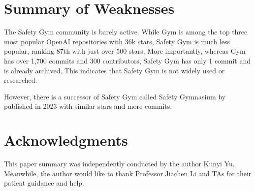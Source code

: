 \documentclass{article}
\begin{document}
\section{Summary of Weaknesses}

The Safety Gym community is barely active. While Gym is among the top three most popular OpenAI repositories with 36k stars, Safety Gym is much less popular, ranking 87th with just over 500 stars. More importantly, whereas Gym has over 1,700 commits and 300 contributors, Safety Gym has only 1 commit and is already archived. This indicates that Safety Gym is not widely used or researched.

However, there is a successor of Safety Gym called Safety Gymnasium by \citet{ji2023safety} published in 2023 with similar stars and more commits.

\section*{Acknowledgments}
This paper summary was independently conducted by the author Kunyi Yu. Meanwhile, the author would like to thank Professor Jiachen Li and TAs for their patient guidance and help.



\end{document}
